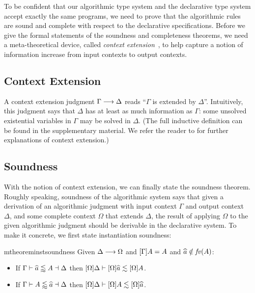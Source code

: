 To be confident that our algorithmic type system and the declarative type system
accept exactly the same programs, we need to prove that the algorithmic rules
are sound and complete with respect to the declarative specifications. Before we
give the formal statements of the soundness and completeness theorems, we need a
meta-theoretical device, called \textit{context extension}~\cite{dunfield2013complete}, to help capture a
notion of information increase from input contexts to output contexts.

\subsection{Context Extension}
\label{sec:ctxt:extension}


A context extension judgment $\Gamma \longrightarrow \Delta$ reads ``$\Gamma$ is extended
by $\Delta$''. Intuitively, this judgment says that $\Delta$ has at least as
much information as $\Gamma$: some unsolved existential variables in $\Gamma$
may be solved in $\Delta$. (The full inductive definition can be found in the
supplementary material. We refer the reader to \citet[][Section
4]{dunfield2013complete} for further explanations of context extension.)

\subsection{Soundness}

With the notion of context extension, we can finally state the soundness
theorem. Roughly speaking, soundness of the algorithmic system says that given a
derivation of an algorithmic judgment with input context $\Gamma$ and output
context $\Delta$, and some complete context $\Omega$ that extends $\Delta$, the
result of applying $\Omega$ to the given algorithmic judgment should be
derivable in the declarative system. To make it concrete, we first state
instantiation soundness:

\begin{restatable}{mtheorem}{instsoundness} \label{thm:inst_soundness}%
  Given $\Delta \longrightarrow \Omega$ and $[\Gamma]A = A$ and $\widehat{a} \notin \mathit{fv}(A)$:
  \begin{itemize}
  \item If $\Gamma \vdash \widehat{a} \lessapprox A \dashv \Delta$ then $[\Omega]\Delta \vdash [\Omega]\widehat{a} \lesssim [\Omega]A$.
  \item If $\Gamma \vdash A \lessapprox \widehat{a} \dashv \Delta$ then $[\Omega]\Delta \vdash [\Omega]A \lesssim [\Omega]\widehat{a}$.
  \end{itemize}
\end{restatable}

